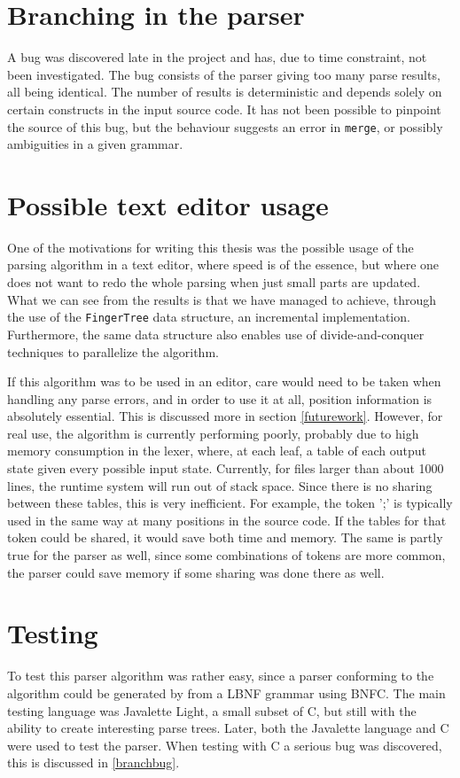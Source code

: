 \documentclass[a4paper,12pt,notitlepage]{report}
\begin{document}
\section{Branching in the parser}
A bug was discovered late in the project and has, due to time constraint, not
been investigated. The bug consists of the parser giving too many parse 
results, all being identical. The number of results is deterministic and depends
solely on certain constructs in the input source code. It has not been possible
to pinpoint the source of this bug, but the behaviour suggests an error in
\texttt{merge}, or possibly ambiguities in a given grammar. \label{branchbug}

\section{Possible text editor usage}
One of the motivations for writing this thesis was the possible usage of the
parsing algorithm in a text editor, where speed is of the essence, but where one
does not want to redo the whole parsing when just small parts are updated. What
we can see from the results is that we have managed to achieve, through the use
of the \texttt{FingerTree} data structure, an incremental implementation.
Furthermore, the same data structure also enables use of divide-and-conquer
techniques to parallelize the algorithm. 

If this algorithm was to be used in an editor, care would need to be taken when
handling any parse errors, and in order to use it at all, position information
is absolutely essential. This is discussed more in section \ref{futurework}.
However, for real use, the algorithm is currently performing poorly, probably
due to high memory consumption in the lexer, where, at each leaf, a table of
each output state given every possible input state.  Currently, for files larger
than about 1000 lines, the runtime system will run out of stack space.  Since
there is no sharing between these tables, this is very inefficient. For example,
the token ';' is typically used in the same way at many positions in the source
code. If the tables for that token could be shared, it would save both time and
memory. The same is partly true for the parser as well, since some combinations
of tokens are more common, the parser could save memory if some sharing was done
there as well.

\section{Testing}
To test this parser algorithm was rather easy, since a parser conforming to
the algorithm could be generated by from a LBNF grammar using BNFC. The main
testing language was Javalette Light, a small subset of C, but still with the
ability to create interesting parse trees. Later, both the Javalette language
and C were used to test the parser. When testing with C a serious bug was
discovered, this is discussed in \ref{branchbug}.
\end{document}
